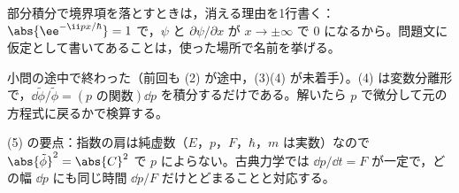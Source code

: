 \mikai
\item 部分積分で境界項を落とすときは，消える理由を1行書く：$\abs{\ee^{-\ii px/\hbar}}=1$ で，$\psi$ と $\partial\psi/\partial x$ が $x\to\pm\infty$ で $0$ になるから。問題文に仮定として書いてあることは，使った場所で名前を挙げる。
\item {} 小問の途中で終わった（前回も (2) が途中，(3)(4) が未着手）。(4) は変数分離形で，$\dd\tilde{\phi}/\tilde{\phi}=(\text{$p$ の関数})\dd p$ を積分するだけである。解いたら $p$ で微分して元の方程式に戻るかで検算する。
\item (5) の要点：指数の肩は純虚数（$E$，$p$，$F$，$\hbar$，$m$ は実数）なので $\abs{\tilde{\phi}}^{2}=\abs{C}^{2}$ で $p$ によらない。古典力学では $\dd p/\dd t=F$ が一定で，どの幅 $\dd p$ にも同じ時間 $\dd p/F$ だけとどまることと対応する。
